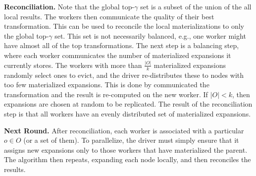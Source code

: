 \vspace{0.25em} \noindent  \textbf{Reconciliation. }  Note that the global top-$\gamma$ set is a subset of the union of the all local results.
The workers then communicate the quality of their best transformation. This can be used to reconcile the local materializations to only the global top-$\gamma$ set.
This set is not necessarily balanced, e.g., one worker might have almost all of the top transformations.
The next step is a balancing step, where each worker communicates the number of materialized expansions it currently stores.
The workers with more than $\frac{|O|}{k}$ materialized expansions  randomly select ones to evict, and the driver re-distributes these to nodes with too few materialized expansions.
This is done by communicated the transformation and the result is re-computed on the new worker.
If $|O| < k$, then expansions are chosen at random to be replicated.
The result of the reconciliation step is that all workers have an evenly distributed set of materialized expansions.

\vspace{0.25em} \noindent  \textbf{Next Round. } After reconciliation, each worker is associated with a particular $o \in O$ (or a set of them). To parallelize, the driver must simply ensure that it assigns new expansions only to those workers that have materialized the parent.
The algorithm then repeats, expanding each node locally, and then reconciles the results.




